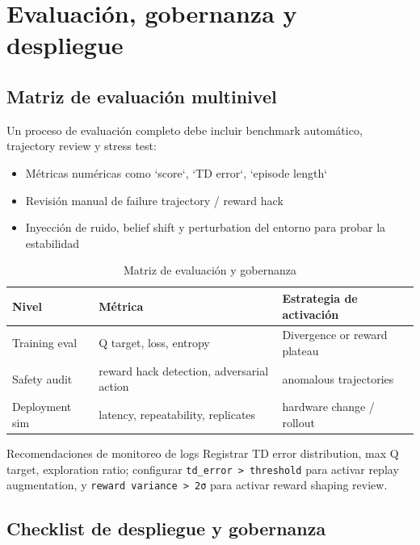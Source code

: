 \section{Evaluación, gobernanza y despliegue}

\subsection{Matriz de evaluación multinivel}

Un proceso de evaluación completo debe incluir benchmark automático, trajectory review y stress test:

\begin{itemize}
    \item Métricas numéricas como `score`, `TD error`, `episode length`
    \item Revisión manual de failure trajectory / reward hack
    \item Inyección de ruido, belief shift y perturbation del entorno para probar la estabilidad
\end{itemize}

\begin{table}[H]
\centering
\begin{tabular}{p{} p{} p{}}
\toprule
Nivel & Métrica & Estrategia de activación \\
\midrule
Training eval & Q target, loss, entropy & Divergence or reward plateau \\
Safety audit & reward hack detection, adversarial action & anomalous trajectories \\
Deployment sim & latency, repeatability, replicates & hardware change / rollout \\
\bottomrule
\end{tabular}
\caption{Matriz de evaluación y gobernanza}
\end{table}

\begin{knowledgebox}{Recomendaciones de monitoreo de logs}
Registrar TD error distribution, max Q target, exploration ratio; configurar \texttt{td\_error > threshold} para activar replay augmentation, y \texttt{reward variance > 2σ} para activar reward shaping review.
\end{knowledgebox}

\subsection{Checklist de despliegue y gobernanza}

